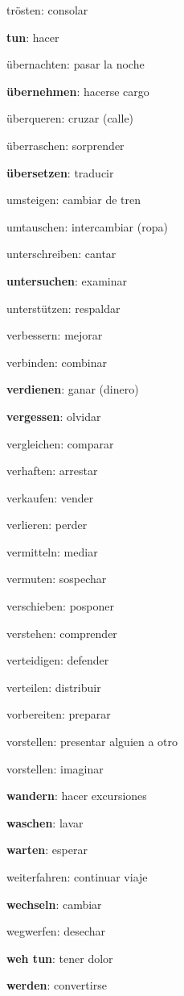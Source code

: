 \begin{multicols}{2}
\begin{myitemize}
\item trösten: consolar
\item \textbf{tun}: hacer
\item übernachten: pasar la noche
\item \textbf{übernehmen}: hacerse cargo
\item überqueren: cruzar (calle)
\item überraschen: sorprender
\item \textbf{übersetzen}: traducir
\item umsteigen: cambiar de tren
\item umtauschen: intercambiar (ropa)
\item unterschreiben: cantar
\item \textbf{untersuchen}: examinar
\item unterstützen: respaldar
\item verbessern: mejorar
\item verbinden: combinar
\item \textbf{verdienen}: ganar (dinero)
\item \textbf{vergessen}: olvidar
\item vergleichen: comparar
\item verhaften: arrestar
\item verkaufen: vender
\item verlieren: perder
\item vermitteln: mediar
\item vermuten: sospechar
\item verschieben: posponer
\item verstehen: comprender
\item verteidigen: defender
\item verteilen: distribuir
\item vorbereiten: preparar
\item vorstellen: presentar alguien a otro
\item vorstellen: imaginar
\item \textbf{wandern}: hacer excursiones
\item \textbf{waschen}: lavar
\item \textbf{warten}: esperar
\item weiterfahren: continuar viaje
\item \textbf{wechseln}: cambiar
\item wegwerfen: desechar
\item \textbf{weh tun}: tener dolor
\item \textbf{werden}: convertirse

\end{myitemize}
\end{multicols}

